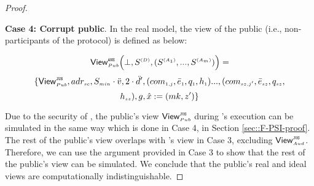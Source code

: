 \begin{proof}
 \

\noindent\textbf{Case 4: Corrupt public}. In the real model, the view of the public (i.e., non-participants of the protocol) is defined as below: 
 

 $$ \mathsf{View}_{\scriptscriptstyle Pub}^{\scriptscriptstyle \mathtt{ANE}} \Big(\bot, S^{\scriptscriptstyle (D)},(S^{\scriptscriptstyle (A_1)},..., S^{\scriptscriptstyle (A_m)})\Big)=$$ $$ 
\{\mathsf{View}^{\scriptscriptstyle \mathtt{JUS}}_{\scriptscriptstyle Pub}, adr_{\scriptscriptstyle sc}, S_{\scriptscriptstyle min}\cdot \ddot{v}, 2\cdot \ddot{d}', (com_{\scriptscriptstyle 1,j}, \bar{e}_{\scriptscriptstyle 1}, q_{\scriptscriptstyle 1}, h_{\scriptscriptstyle 1})..., (com_{\scriptscriptstyle sz, j'}, \bar{e}_{\scriptscriptstyle sz}, q_{\scriptscriptstyle {sz}}, $$ $$h_{\scriptscriptstyle sz}), g, \hat{x}:=({mk}, z')\}$$
 
 
 
  Due to the security of \fpsi, the public's view $\mathsf{View}^{\scriptscriptstyle \mathtt{JUS}}_{\scriptscriptstyle Pub}$ during \fpsi's execution can be simulated in the same way which is done in Case 4, in Section \ref{sec::F-PSI-proof}. The rest of the public's view overlaps with \aud's view in Case 3, excluding $\mathsf{View}^{\scriptscriptstyle \mathtt{JUS}}_{\scriptscriptstyle Aud}$. Therefore, we can use the argument provided in Case 3 to show that the rest of the public's view can be simulated.     
   We  conclude that the public's real and ideal views are computationally indistinguishable. 
\end{proof}















